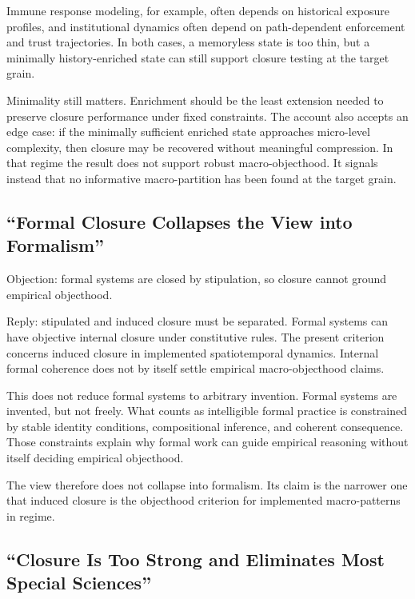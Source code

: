 Immune response modeling, for example, often depends on historical
exposure profiles, and institutional dynamics often depend on
path-dependent enforcement and trust trajectories. In both cases, a
memoryless state is too thin, but a minimally history-enriched state can
still support closure testing at the target grain.

Minimality still matters. Enrichment should be the least extension
needed to preserve closure performance under fixed constraints. The
account also accepts an edge case: if the minimally sufficient enriched
state approaches micro-level complexity, then closure may be recovered
without meaningful compression. In that regime the result does not
support robust macro-objecthood. It signals instead that no informative
macro-partition has been found at the target grain.

\subsection{``Formal Closure Collapses the View into
	Formalism''}\label{formal-closure-collapses-the-view-into-formalism}

Objection: formal systems are closed by stipulation, so closure cannot
ground empirical objecthood.

Reply: stipulated and induced closure must be separated. Formal systems
can have objective internal closure under constitutive rules. The
present criterion concerns induced closure in implemented spatiotemporal
dynamics. Internal formal coherence does not by itself settle empirical
macro-objecthood claims.

This does not reduce formal systems to arbitrary invention. Formal
systems are invented, but not freely. What counts as intelligible formal
practice is constrained by stable identity conditions, compositional
inference, and coherent consequence. Those constraints explain why
formal work can guide empirical reasoning without itself deciding
empirical objecthood.

The view therefore does not collapse into formalism. Its claim is the
narrower one that induced closure is the objecthood criterion for
implemented macro-patterns in regime.

\subsection{``Closure Is Too Strong and Eliminates Most Special
	Sciences''}\label{closure-is-too-strong-and-eliminates-most-special-sciences}

